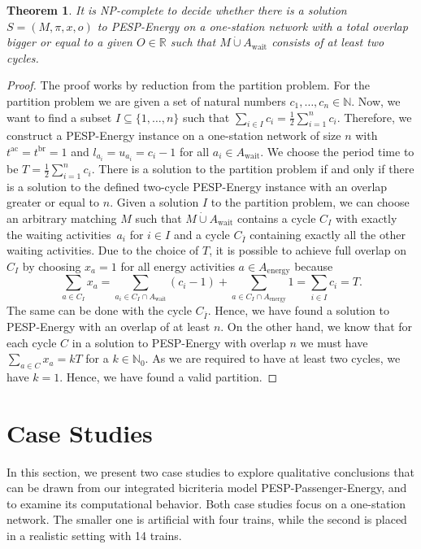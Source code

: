 \documentclass[11pt,a4paper]{article}
\newcommand{\dotcup}{\mathbin{\dot\cup}}
\newcommand{\wait}{\mathrm{wait}}
\newcommand{\energy}{\mathrm{energy}}
\newcommand{\energyact}{M}               %
\newcommand{\ac}{\mathrm{ac}}
\newcommand{\br}{\mathrm{br}}
\newcommand{\pespenergy}{PESP-Energy\xspace}
\newcommand{\pesppassenergy}{PESP-Passenger-Energy\xspace}
\newcommand{\osn}{one-station network\xspace}
\newcommand{\R}{\mathbb R}
\newtheorem{theorem}{Theorem}[section]
\theoremstyle{definition}
\theoremstyle{remark}
\begin{document}
\begin{theorem}
\label{thm:pesp-energy-two-cycles}
	It is NP-complete to decide whether there is a solution $S=(\energyact, \pi, x, o)$ to \pespenergy on a \osn with a total overlap bigger or equal to a given $O \in \R$ 
    such that $\energyact\dotcup A_{\wait}$ consists of at least two cycles.
\end{theorem}
\begin{proof}
    The proof works by reduction from the partition problem. For the partition problem we are given a set of natural numbers $c_1, \dots, c_n \in \mathbb N$. Now, we want to find a subset $I \subseteq \{1, \dots, n\}$ such that $\sum_{i \in I} c_i = \frac{1}{2}\sum_{i=1}^n c_i$. Therefore, we construct a \pespenergy instance on a \osn of size $n$ with $t^{\ac} = t^{\br}=1$ and $l_{a_i} = u_{a_i} = c_i -1$ for all $a_i \in A_{\wait}$. We choose the period time to be $T= \frac{1}{2}\sum_{i=1}^n c_i$. There is a solution to the partition problem if and only if there is a solution to the defined two-cycle \pespenergy instance with an overlap greater or equal to $n$. Given a solution $I$ to the partition problem, we can choose an arbitrary matching $\energyact$ such that $\energyact \dotcup A_{\wait}$ contains a cycle $C_I$ with exactly the waiting activities~$a_i$ for $i \in I$ and a cycle $C_{\overline{I}}$ containing exactly all the other waiting activities. Due to the choice of $T$, it is possible to achieve full overlap on $C_I$ by choosing $x_{a} = 1$ for all energy activities $a \in A_{\energy}$ because 
    $$\sum_{a \in C_I} x_a = \sum_{a_i \in C_I \cap A_{\wait}} (c_i - 1) + \sum_{a \in C_I \cap A_{\energy}} 1 = \sum_{i \in I} c_i = T.$$
    The same can be done with the cycle $C_{\overline{I}}$. Hence, we have found a solution to \pespenergy with an overlap of at least $n$. On the other hand, we know that for each cycle $C$ in a solution to \pespenergy with overlap $n$ we must have $\sum_{a \in C} x_a = kT$ for a $k \in \mathbb N_0$. As we are required to have at least two cycles, we have $k = 1$. Hence, we have found a valid partition.
\end{proof}

\section{Case Studies}
\label{sec:numerics}

In this section, we present two case studies to explore qualitative conclusions that can be drawn from our integrated bicriteria model \pesppassenergy, and to examine its computational behavior. Both case studies focus on a one-station network. The smaller one is artificial with four trains, while the second is placed in a realistic setting with 14 trains.
\end{document}
